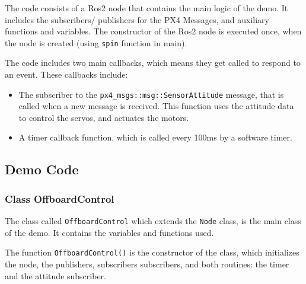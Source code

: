 \documentclass[a4paper]{article}
\begin{document}
The code consists of a Ros2 node that contains the main logic of the demo. 
It includes the subscribers/ publishers for the PX4 Messages, and auxiliary functions and variables. 
The constructor of the Ros2 node is executed once, when the node is created (using \verb|spin| function in main). 

The code includes two main callbacks, which means they get called to respond to an event. These callbacks include: 
\begin{itemize}
    \item The subscriber to the \verb|px4_msgs::msg::SensorAttitude| message, that is called when a new message is received. This function uses the attitude data to control the servos, and actuates the motors. 
    \item A timer callback function, which is called every 100ms by a software timer. 
\end{itemize}

\subsection{Demo Code}

\subsubsection{Class OffboardControl}

The class called \verb|OffboardControl| which extends the \verb|Node| class, is the main class of the demo. 
It contains the variables and functions used. 

The function \verb|OffboardControl()| is the constructor of the class, which initializes the node, the publishers, subscribers subscribers, and both routines: the timer and the attitude subscriber.
\end{document}
